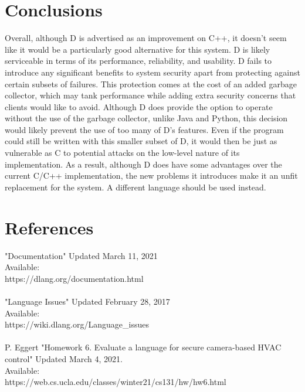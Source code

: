 \section{Conclusions}
\par
Overall, although D is advertised as an improvement on C++, it doesn't seem like
it would be a particularly good alternative for this system. D is likely
serviceable in terms of its performance, reliability, and usability. D fails to
introduce any significant benefits to system security apart from protecting
against certain subsets of failures. This protection comes at the cost of an
added garbage collector, which may tank performance while adding extra security
concerns that clients would like to avoid. Although D does provide the option to
operate without the use of the garbage collector, unlike Java and Python, this
decision would likely prevent the use of too many of D's features. Even if the
program could still be written with this smaller subset of D, it would then be
just as vulnerable as C to potential attacks on the low-level nature of its
implementation. As a result, although D does have some advantages over the
current C/C++ implementation, the new problems it introduces make it an unfit
replacement for the system. A different language should be used instead.

\section{References}
"Documentation"
Updated March 11, 2021 \\
Available: \\ https://dlang.org/documentation.html \\
\\
"Language Issues"
Updated February 28, 2017 \\
Available: \\ https://wiki.dlang.org/Language\_issues \\
\\
P. Eggert "Homework 6. Evaluate a language for secure camera-based HVAC control" 
Updated March 4, 2021. \\
Available: \\ https://web.cs.ucla.edu/classes/winter21/cs131/hw/hw6.html \\





